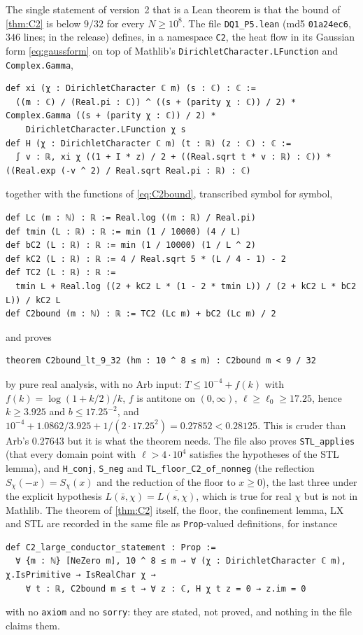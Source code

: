 \documentclass[11pt]{article}
\theoremstyle{definition}
\newcommand{\lean}[1]{\texttt{#1}}
\begin{document}
The single statement of version~2 that is a Lean theorem is that the bound of \cref{thm:C2} is below $9/32$ for every $N \ge 10^8$. The file \lean{DQ1\_P5.lean} (md5 \lean{01a24ec6}, $346$ lines;  in the release) defines, in a namespace \lean{C2}, the heat flow in its Gaussian form \eqref{eq:gaussform} on top of Mathlib's \lean{DirichletCharacter.LFunction} and \lean{Complex.Gamma},
\begin{lstlisting}
def xi (χ : DirichletCharacter ℂ m) (s : ℂ) : ℂ :=
  ((m : ℂ) / (Real.pi : ℂ)) ^ ((s + (parity χ : ℂ)) / 2) * Complex.Gamma ((s + (parity χ : ℂ)) / 2) *
    DirichletCharacter.LFunction χ s
def H (χ : DirichletCharacter ℂ m) (t : ℝ) (z : ℂ) : ℂ :=
  ∫ v : ℝ, xi χ ((1 + I * z) / 2 + ((Real.sqrt t * v : ℝ) : ℂ)) * ((Real.exp (-v ^ 2) / Real.sqrt Real.pi : ℝ) : ℂ)
\end{lstlisting}
together with the functions of \eqref{eq:C2bound}, transcribed symbol for symbol,
\begin{lstlisting}
def Lc (m : ℕ) : ℝ := Real.log ((m : ℝ) / Real.pi)
def tmin (L : ℝ) : ℝ := min (1 / 10000) (4 / L)
def bC2 (L : ℝ) : ℝ := min (1 / 10000) (1 / L ^ 2)
def kC2 (L : ℝ) : ℝ := 4 / Real.sqrt 5 * (L / 4 - 1) - 2
def TC2 (L : ℝ) : ℝ :=
  tmin L + Real.log ((2 + kC2 L * (1 - 2 * tmin L)) / (2 + kC2 L * bC2 L)) / kC2 L
def C2bound (m : ℕ) : ℝ := TC2 (Lc m) + bC2 (Lc m) / 2
\end{lstlisting}
and proves
\begin{lstlisting}
theorem C2bound_lt_9_32 (hm : 10 ^ 8 ≤ m) : C2bound m < 9 / 32
\end{lstlisting}
by pure real analysis, with no Arb input: $T \le 10^{-4} + f(k)$ with $f(k) = \log(1 + k/2)/k$, $f$ is antitone on $(0,\infty)$, $\ell \ge \ell_0 \ge 17.25$, hence $k \ge 3.925$ and $b \le 17.25^{-2}$, and $10^{-4} + 1.0862/3.925 + 1/(2\cdot17.25^2) = 0.27852 < 0.28125$. This is cruder than Arb's $0.27643$ but it is what the theorem needs. The file also proves \lean{STL\_applies} (that every domain point with $\ell > 4\cdot10^4$ satisfies the hypotheses of the STL lemma), and \lean{H\_conj}, \lean{S\_neg} and \lean{TL\_floor\_C2\_of\_nonneg} (the reflection $S_\chi(-x) = S_\chi(x)$ and the reduction of the floor to $x \ge 0$), the last three under the explicit hypothesis $L(\bar s,\chi) = \overline{L(s,\chi)}$, which is true for real $\chi$ but is not in Mathlib. The theorem of \cref{thm:C2} itself, the floor, the confinement lemma, LX and STL are recorded in the same file as \lean{Prop}-valued definitions, for instance
\begin{lstlisting}
def C2_large_conductor_statement : Prop :=
  ∀ {m : ℕ} [NeZero m], 10 ^ 8 ≤ m → ∀ (χ : DirichletCharacter ℂ m), χ.IsPrimitive → IsRealChar χ →
    ∀ t : ℝ, C2bound m ≤ t → ∀ z : ℂ, H χ t z = 0 → z.im = 0
\end{lstlisting}
with no \lean{axiom} and no \lean{sorry}: they are stated, not proved, and nothing in the file claims them.
\end{document}
